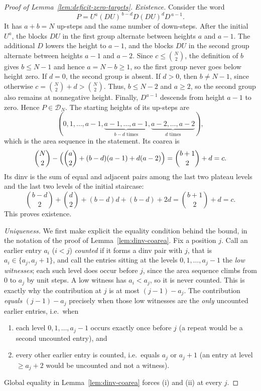 \documentclass[11pt]{article}
\theoremstyle{definition}
\newcommand{\D}{\mathcal D}
\begin{document}
\begin{proof}[Proof of Lemma~\ref{lem:deficit-zero-targets}]
\emph{Existence.}
Consider the word
\[
   P=U^a(DU)^{\,b-d}D(DU)^dD^{\,a-1}.
\]
It has $a+b=N$ up-steps and the same number of down-steps.  After the initial
$U^a$, the blocks $DU$ in the first group alternate between heights $a$ and
$a-1$.  The additional $D$ lowers the height to $a-1$, and the blocks $DU$ in
the second group alternate between heights $a-1$ and $a-2$.  Since
$c\le\binom N2$, the definition of $b$ gives $b\le N-1$ and hence
$a=N-b\ge1$, so the first group never goes below height zero.  If $d=0$, the
second group is absent.  If $d>0$, then $b\ne N-1$, since
otherwise $c=\binom N2+d>\binom N2$.  Thus, $b\le N-2$ and $a\ge2$, so the
second group also remains at nonnegative height.  Finally, $D^{a-1}$ descends
from height $a-1$ to zero.  Hence $P\in\D_N$.  The starting heights of its
up-steps are
\[
   (0,1,\ldots,a-1,
     \underbrace{a-1,\ldots,a-1}_{b-d\text{ times}},
     \underbrace{a-2,\ldots,a-2}_{d\text{ times}}),
\]
which is the area sequence in the statement.  Its coarea is
\[
   \binom N2-\Bigl(\binom a2+(b-d)(a-1)+d(a-2)\Bigr)
   =\binom{b+1}{2}+d=c.
\]
Its dinv is the sum of equal and adjacent pairs among the last two plateau
levels and the last two levels of the initial staircase:
\[
   \binom{b-d}{2}+\binom d2+(b-d)d+(b-d)+2d
   =\binom{b+1}{2}+d=c.
\]
This proves existence.

\vspace{0.5em}
\noindent\emph{Uniqueness.}
We first make explicit the equality condition behind the bound, in the notation
of the proof of Lemma~\ref{lem:dinv-coarea}.  Fix a position $j$.  Call an
earlier entry $a_i$ ($i<j$) \emph{counted} if it forms a dinv pair with $j$, that
is $a_i\in\{a_j,a_j+1\}$, and call the entries sitting at the levels
$0,1,\ldots,a_j-1$ the \emph{low witnesses}; each such level does occur before
$j$, since the area sequence climbs from $0$ to $a_j$ by unit steps.  A low
witness has $a_i<a_j$, so it is never counted. This is exactly why the
contribution at $j$ is at most $(j-1)-a_j$.  The contribution \emph{equals}
$(j-1)-a_j$ precisely when those low witnesses are the \emph{only} uncounted
earlier entries, i.e.\ when
\begin{enumerate}[label=(\roman*)]
\item each level $0,1,\ldots,a_j-1$ occurs exactly once before $j$ (a repeat
would be a second uncounted entry), and
\item every other earlier entry is counted, i.e.\ equals $a_j$ or $a_j+1$ (an
entry at level $\ge a_j+2$ would be uncounted and not a witness).
\end{enumerate}
Global equality in Lemma~\ref{lem:dinv-coarea} forces (i) and (ii) at every $j$.


\end{proof}
\end{document}

